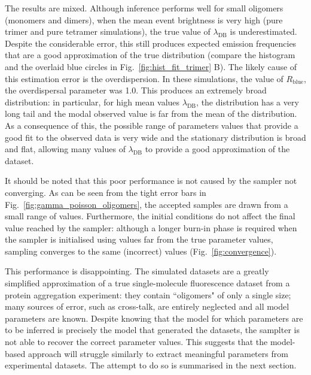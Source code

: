 The results are mixed. Although inference performs well for small oligomers (monomers and dimers), when the mean event brightness is very high (pure trimer and pure tetramer simulations), the true value of $\lambda_{\text{DB}}$ is underestimated. Despite the considerable error, this still produces expected emission frequencies that are a good approximation of the true distribution (compare the histogram and the overlaid blue circles in Fig.~\ref{fig:hist_fit_trimer} B). The likely cause of this estimation error is the overdispersion. In these simulations, the value of $R_{\text{blue}}$, the overdispersal parameter was 1.0. This produces an extremely broad distribution: in particular, for high mean values $\lambda_{\text{DB}}$, the distribution has a very long tail and the modal observed value is far from the mean of the distribution. As a consequence of this, the possible range of parameters values that provide a good fit to the observed data is very wide and the stationary distribution is broad and flat, allowing many values of $\lambda_{\text{DB}}$ to provide a good approximation of the dataset.

It should be noted that this poor performance is not caused by the sampler not converging. As can be seen from the tight error bars in Fig.~\ref{fig:gamma_poisson_oligomers}, the accepted samples are drawn from a small range of values. Furthermore, the initial conditions do not affect the final value reached by the sampler: although a longer burn-in phase is required when the sampler is initialised using values far from the true parameter values, sampling converges to the same (incorrect) values (Fig.~\ref{fig:convergence}).

This performance is disappointing. The simulated datasets are a greatly simplified approximation of a true single-molecule fluorescence dataset from a protein aggregation experiment: they contain ``oligomers" of only a single size; many sources of error, such as cross-talk, are entirely neglected and all model parameters are known. Despite knowing that the model for which parameters are to be inferred is precisely the model that generated the datasets, the samplter is not able to recover the correct parameter values. This suggests that the model-based approach will struggle similarly to extract meaningful parameters from experimental datasets. The attempt to do so is summarised in the next section.

